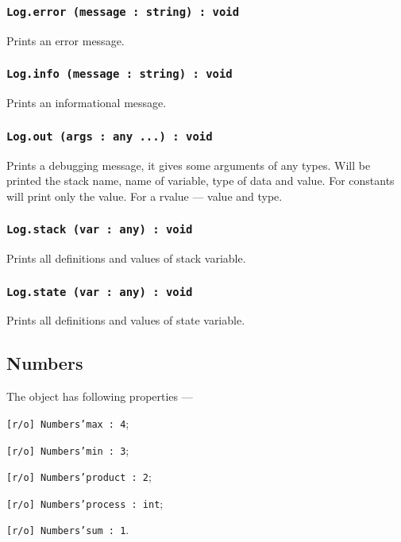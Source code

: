 \subsubsection{\texttt{Log.error (message : string) : void}}

Prints an error message.

\subsubsection{\texttt{Log.info (message : string) : void}}

Prints an informational message.

\subsubsection{\texttt{Log.out (args : any ...) : void}}

Prints a debugging message, it gives some arguments of any types. Will be printed the stack name, name of variable, type of data and value. For constants will print only the value. For a rvalue — value and type.

\subsubsection{\texttt{Log.stack (var : any) : void}}

Prints all definitions and values of stack variable.

\subsubsection{\texttt{Log.state (var : any) : void}}

Prints all definitions and values of state variable.

\subsection{{\color{orange} Numbers}}

The object \numbers{} has following properties —
\begin{icItems}
	\item \texttt{[r/o] Numbers'max : 4};
	\item \texttt{[r/o] Numbers'min : 3};
	\item \texttt{[r/o] Numbers'product : 2};
	\item \texttt{[r/o] Numbers'process : int};
	\item \texttt{[r/o] Numbers'sum : 1}.
\end{icItems}

